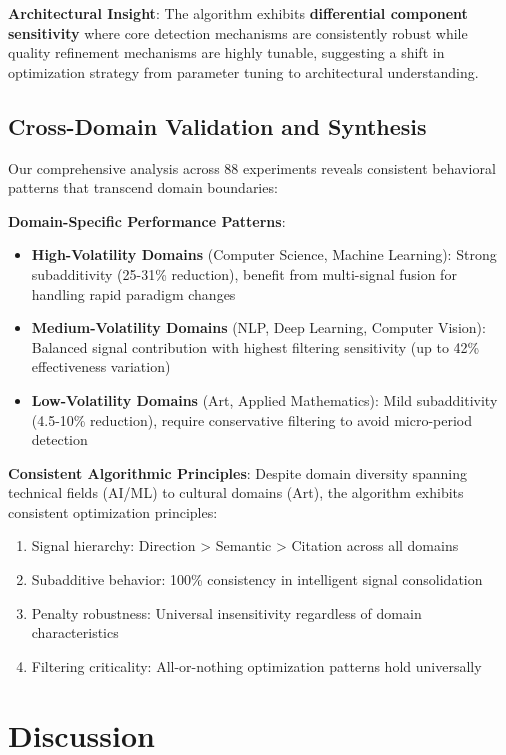 \documentclass[conference]{IEEEtran}
\begin{document}
\textbf{Architectural Insight}: The algorithm exhibits \textbf{differential component sensitivity} where core detection mechanisms are consistently robust while quality refinement mechanisms are highly tunable, suggesting a shift in optimization strategy from parameter tuning to architectural understanding.

\subsection{Cross-Domain Validation and Synthesis}

Our comprehensive analysis across 88 experiments reveals consistent behavioral patterns that transcend domain boundaries:

\textbf{Domain-Specific Performance Patterns}:
\begin{itemize}
\item \textbf{High-Volatility Domains} (Computer Science, Machine Learning): Strong subadditivity (25-31\% reduction), benefit from multi-signal fusion for handling rapid paradigm changes
\item \textbf{Medium-Volatility Domains} (NLP, Deep Learning, Computer Vision): Balanced signal contribution with highest filtering sensitivity (up to 42\% effectiveness variation)
\item \textbf{Low-Volatility Domains} (Art, Applied Mathematics): Mild subadditivity (4.5-10\% reduction), require conservative filtering to avoid micro-period detection
\end{itemize}

\textbf{Consistent Algorithmic Principles}: Despite domain diversity spanning technical fields (AI/ML) to cultural domains (Art), the algorithm exhibits consistent optimization principles:
\begin{enumerate}
\item Signal hierarchy: Direction > Semantic > Citation across all domains
\item Subadditive behavior: 100\% consistency in intelligent signal consolidation
\item Penalty robustness: Universal insensitivity regardless of domain characteristics
\item Filtering criticality: All-or-nothing optimization patterns hold universally
\end{enumerate}

\section{Discussion}
\end{document}
